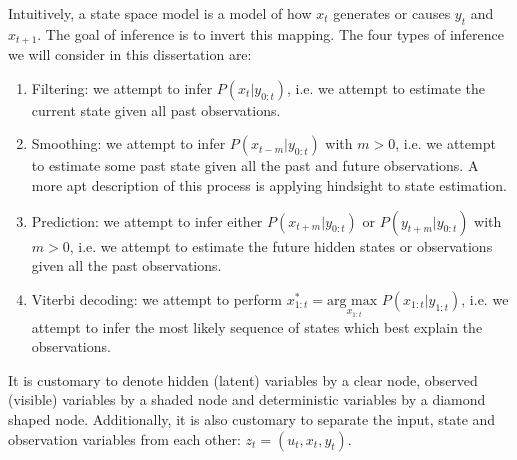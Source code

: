 Intuitively, a state space model is a model of how $x_t$ generates or causes $y_t$ and $x_{t+1}$. The goal of inference is to invert this mapping. The four types of inference we will consider in this dissertation are:
\begin{enumerate}
\item
Filtering: we attempt to infer $P(x_t|y_{0:t})$, i.e. we attempt to estimate the current state given all past observations.
\item
Smoothing: we attempt to infer $P(x_{t-m}|y_{0:t})$ with $m > 0$, i.e. we attempt to estimate some past state given all the past and future observations. A more apt description of this process is applying hindsight to state estimation.
\item
Prediction: we attempt to infer either $P(x_{t+m}|y_{0:t})$ or $P(y_{t+m}|y_{0:t})$ with $m>0$, i.e. we attempt to estimate the future hidden states or observations given all the past observations.
\item
Viterbi decoding: we attempt to perform $x_{1:t}^* = \underset{x_{1:t}}{\text{arg max }} P(x_{1:t}|y_{1:t})$, i.e. we attempt to infer the most likely sequence of states which best explain the observations.
\end{enumerate}
It is customary to denote hidden (latent) variables by a clear node, observed (visible) variables by a shaded node and deterministic variables by a diamond shaped node. Additionally, it is also customary to separate the input, state and observation variables from each other: $z_t = (u_t, x_t, y_t)$. 

